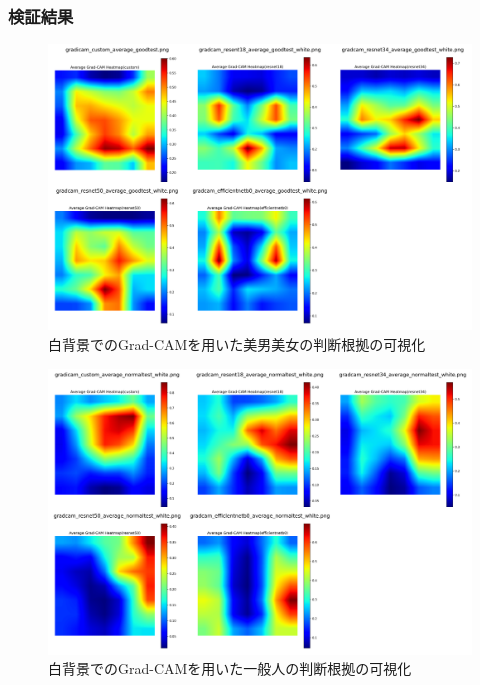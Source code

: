 \documentclass[a4paper,11pt,titlepage]{jsarticle}
\begin{document}
\subsubsection{検証結果}
\begin{figure}[H]
    \centering
    \includegraphics[width=1.1\textwidth]{white_combined_images_good.png}
    \caption{白背景でのGrad-CAMを用いた美男美女の判断根拠の可視化}
    \label{fig:gradcam_good_white}
\end{figure}
\begin{figure}[H]
    \centering
    \includegraphics[width=1.1\textwidth]{white_combined_images_normal.png}
    \caption{白背景でのGrad-CAMを用いた一般人の判断根拠の可視化}
    \label{fig:gradcam_normal_white}
\end{figure}
\end{document}
